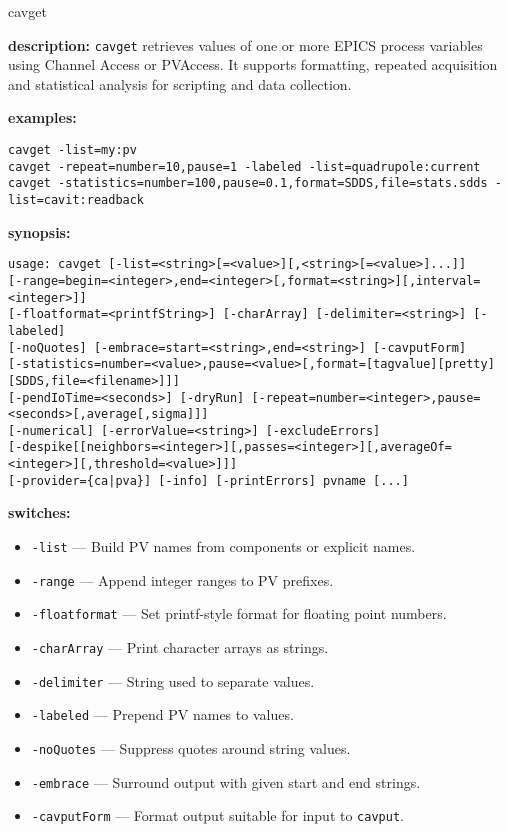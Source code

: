 %
%
\begin{sddsprog}{cavget}
\item \textbf{description:}
\verb+cavget+ retrieves values of one or more EPICS process variables using Channel Access or PVAccess.
It supports formatting, repeated acquisition and statistical analysis for scripting and data collection.
\item \textbf{examples:}
\begin{verbatim}
cavget -list=my:pv
cavget -repeat=number=10,pause=1 -labeled -list=quadrupole:current
cavget -statistics=number=100,pause=0.1,format=SDDS,file=stats.sdds -list=cavit:readback
\end{verbatim}
\item \textbf{synopsis:}
\begin{verbatim}
usage: cavget [-list=<string>[=<value>][,<string>[=<value>]...]]
[-range=begin=<integer>,end=<integer>[,format=<string>][,interval=<integer>]]
[-floatformat=<printfString>] [-charArray] [-delimiter=<string>] [-labeled]
[-noQuotes] [-embrace=start=<string>,end=<string>] [-cavputForm]
[-statistics=number=<value>,pause=<value>[,format=[tagvalue][pretty][SDDS,file=<filename>]]]
[-pendIoTime=<seconds>] [-dryRun] [-repeat=number=<integer>,pause=<seconds>[,average[,sigma]]]
[-numerical] [-errorValue=<string>] [-excludeErrors]
[-despike[[neighbors=<integer>][,passes=<integer>][,averageOf=<integer>][,threshold=<value>]]]
[-provider={ca|pva}] [-info] [-printErrors] pvname [...]
\end{verbatim}
\item \textbf{switches:}
\begin{itemize}
  \item {\tt -list} --- Build PV names from components or explicit names.
  \item {\tt -range} --- Append integer ranges to PV prefixes.
  \item {\tt -floatformat} --- Set printf-style format for floating point numbers.
  \item {\tt -charArray} --- Print character arrays as strings.
  \item {\tt -delimiter} --- String used to separate values.
  \item {\tt -labeled} --- Prepend PV names to values.
  \item {\tt -noQuotes} --- Suppress quotes around string values.
  \item {\tt -embrace} --- Surround output with given start and end strings.
  \item {\tt -cavputForm} --- Format output suitable for input to \verb+cavput+.

\end{itemize}
\end{sddsprog}
